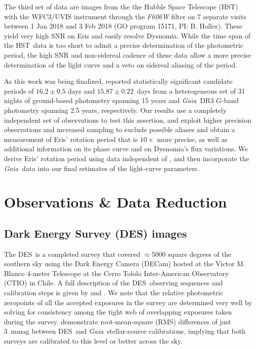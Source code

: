 \documentclass[onecolumn]{aastex631}
\newcommand{\des}{DES}
\newcommand{\hst}{HST}
\newcommand{\wfc}{WFC3}
\newcommand{\gaia}{\textit{Gaia}}
\begin{document}
The third set of data are images from the the Hubble Space Telescope (\hst) with the \wfc/UVIS instrument through the {\it F606W} filter on 7 separate visits between 1 Jan 2018 and 3 Feb 2018 (GO program 15171, PI: B. Holler).  These yield very high SNR on Eris and easily resolve Dysnomia.  While the time span of the \hst\ data is too short to admit a precise determination of the photometric period, the high SNR and non-sidereal cadence of these data allow a more precise determination of the light curve and a veto on sidereal aliasing of the period.

As this work was being finalized, \citet{szakats} reported statistically significant candidate periods of $16.2\pm0.5$ days and $15.87\pm0.22$~days from a heterogeneous set of 31 nights of ground-based photometry spanning 15 years and \gaia\ DR3 $G$-band photometry spanning 2.5 years, respectively. Our results use a completely independent set of observations to test this assertion, and exploit higher precision observations and increased sampling to exclude possible aliases and obtain a measurement of Eris' rotation period that is $10\times$ more precise, as well as additional information on its phase curve and on Dysnomia's flux variations.  We derive Eris' rotation period using data independent of \citet{szakats}, and then incorporate the \gaia\ data into our final estimates of the light-curve parameters.

\section{Observations \& Data Reduction}
\subsection{Dark Energy Survey (\des) images}
The \des\ is a completed survey that covered $\approx 5000$ square degrees of the southern sky using the Dark Energy Camera (DECam) hosted at the Victor M. Blanco 4-meter Telescope at the Cerro Tololo Inter-American Observatory (CTIO) in Chile. A full description of the \des\ observing sequences and calibration steps is given by \citet{desdr2,despipeline} and \citet{fgcm}. We note that the relative photometric zeropoints of all the accepted exposures in the survey are determined very well by solving for consistency among the tight web of overlapping exposures taken during the survey. \citet{desdr2} demonstrate root-mean-square (RMS) differences of just 3~mmag between \des\ and \gaia\ stellar-source calibrations, implying that both surveys are calibrated to this level or better across the sky.
\end{document}
